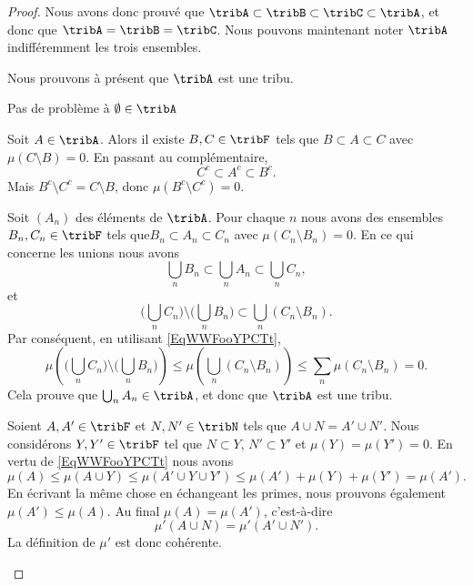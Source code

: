 \begin{proof}
	Nous avons donc prouvé que \( \tribA\subset\tribB\subset\tribC\subset \tribA\), et donc que \( \tribA=\tribB=\tribC\). Nous pouvons maintenant noter \( \tribA\) indifféremment les trois ensembles.

	Nous prouvons à présent que \( \tribA\) est une tribu.

	\begin{subproof}
		Pas de problème à \( \emptyset\in\tribA\)

		Soit \( A\in\tribA\). Alors il existe \( B,C\in\tribF\) tels que \( B\subset A\subset C\) avec \( \mu(C\setminus B)=0\). En passant au complémentaire,
		\begin{equation}
			C^c\subset A^c\subset B^c.
		\end{equation}
		Mais \( B^c\setminus C^c=C\setminus B\), donc \( \mu(B^c\setminus C^c)=0\).

		Soit \( (A_n)\) des éléments de \( \tribA\). Pour chaque \( n\) nous avons des ensembles \( B_n,C_n\in\tribF\) tels que\( B_n\subset A_n\subset C_n\) avec \( \mu(C_n\setminus B_n)=0\). En ce qui concerne les unions nous avons
		\begin{equation}
			\bigcup_nB_n\subset \bigcup_nA_n\subset \bigcup_nC_n,
		\end{equation}
		et
		\begin{equation}
			\big( \bigcup_nC_n\big)\setminus\big( \bigcup_nB_n\big)\subset \bigcup_n(C_n\setminus B_n).
		\end{equation}
		Par conséquent, en utilisant \eqref{EqWWFooYPCTt},
		\begin{equation}
			\mu\left( \big( \bigcup_nC_n\big)\setminus\big( \bigcup_nB_n\big)\right)\leq\mu\left(  \bigcup_n(C_n\setminus B_n)\right)\leq\sum_n\mu(C_n\setminus B_n)=0.
		\end{equation}
		Cela prouve que \( \bigcup_nA_n\in\tribA\), et donc que \( \tribA\) est une tribu.

		Soient \( A,A'\in\tribF\) et \( N,N'\in\tribN\) tels que \( A\cup N=A'\cup N'\). Nous considérons \( Y,Y'\in\tribF\) tel que \( N\subset Y\), \( N'\subset Y'\) et \( \mu(Y)=\mu(Y')=0\). En vertu de \eqref{EqWWFooYPCTt} nous avons
		\begin{equation}
			\mu(A)\leq \mu(A\cup Y)\leq \mu(A'\cup Y\cup Y')\leq\mu(A')+\mu(Y)+\mu(Y')=\mu(A').
		\end{equation}
		En écrivant la même chose en échangeant les primes, nous prouvons également \( \mu(A')\leq \mu(A)\). Au final \( \mu(A)=\mu(A')\), c'est-à-dire
		\begin{equation}
			\mu'(A\cup N)=\mu'(A'\cup N').
		\end{equation}
		La définition de \( \mu'\) est donc cohérente.


\end{subproof}
\end{proof}
